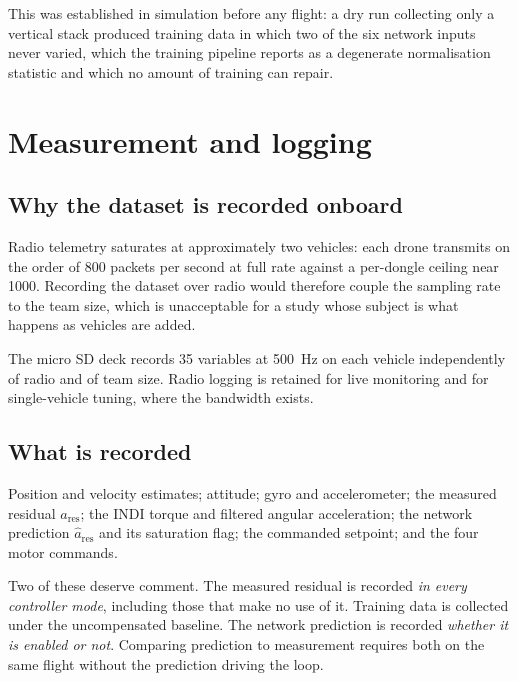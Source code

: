 This was established in simulation before any flight: a dry run collecting only a vertical stack
produced training data in which two of the six network inputs never varied, which the training
pipeline reports as a degenerate normalisation statistic and which no amount of training can
repair.

\section{Measurement and logging}
\label{sec:setup-logging}

\subsection{Why the dataset is recorded onboard}

Radio telemetry saturates at approximately two vehicles: each drone transmits on the order of
\num{800} packets per second at full rate against a per-dongle ceiling near \num{1000}. Recording
the dataset over radio would therefore couple the sampling rate to the team size, which is
unacceptable for a study whose subject is what happens as vehicles are added.

The micro SD deck records \num{35} variables at \SI{500}{\hertz} on each vehicle independently of
radio and of team size. Radio logging is retained for live monitoring and for single-vehicle
tuning, where the bandwidth exists.

\subsection{What is recorded}
\label{sec:setup-recorded}

Position and velocity estimates; attitude; gyro and accelerometer; the measured residual
$a_{\mathrm{res}}$; the INDI torque and filtered angular acceleration; the network prediction
$\hat{a}_{\mathrm{res}}$ and its saturation flag; the commanded setpoint; and the four motor
commands.

Two of these deserve comment. The measured residual is recorded \emph{in every controller mode},
including those that make no use of it. Training data is collected under the uncompensated baseline.
The network prediction is recorded \emph{whether it is enabled or not}. Comparing prediction to
measurement requires both on the same flight without the prediction driving the loop.

